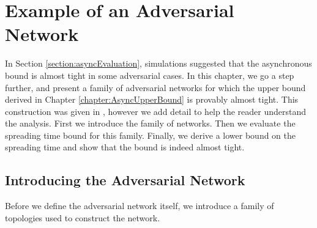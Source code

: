 \chapter{Example of an Adversarial Network}\label{chapter:asyncBoundTight}

In Section \ref{section:asyncEvaluation}, simulations suggested that the asynchronous bound is almost tight in some adversarial cases. In this chapter, we go a step further, and present a family of adversarial networks for which the upper bound derived in Chapter \ref{chapter:AsyncUpperBound} is provably almost tight. This construction was given in \cite{asyncPaper}, however we add detail to help the reader understand the analysis. First we introduce the family of networks. Then we evaluate the spreading time bound for this family. Finally, we derive a lower bound on the spreading time and show that the bound is indeed almost tight.

\section{Introducing the Adversarial Network}

Before we define the adversarial network itself, we introduce a family of topologies used to construct the network.

